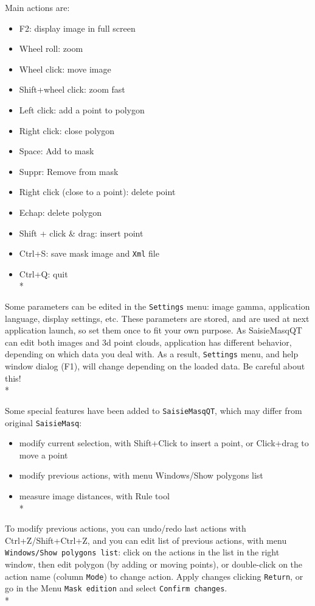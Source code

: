 Main actions are:
\begin{itemize}
\item F2: display image in full screen
\item Wheel roll: zoom
\item Wheel click: move image
\item Shift+wheel click: zoom fast
\item Left click: add a point to polygon
\item Right click: close polygon
\item Space: Add to mask
\item Suppr: Remove from mask
\item Right click (close to a point): delete point
\item Echap: delete polygon
\item Shift + click \& drag: insert point
\item Ctrl+S: save mask image and {\tt Xml} file
\item Ctrl+Q: quit\\*
\end{itemize}

Some parameters can be edited in the {\tt Settings} menu: image gamma, application language, display settings, etc. These parameters are stored, and are used at next application launch, so set them once to fit your own purpose. As SaisieMasqQT can edit both images and 3d point clouds, application has different behavior, depending on which data you deal with. As a result, {\tt Settings} menu, and help window dialog (F1), will change depending on the loaded data. Be careful about this!\\*

Some special features have been added to {\tt SaisieMasqQT}, which may differ from original {\tt SaisieMasq}: 
\begin{itemize}
\item modify current selection, with Shift+Click to insert a point, or Click+drag to move a point
\item modify previous actions, with menu Windows/Show polygons list 
\item measure image distances, with Rule tool\\*
\end{itemize}

To modify previous actions, you can undo/redo last actions with Ctrl+Z/Shift+Ctrl+Z, and you can edit list of previous actions, with menu {\tt Windows/Show polygons list}: click on the actions in the list in the right window, then edit polygon (by adding or moving points), or double-click on the action name (column {\tt Mode}) to change action. Apply changes clicking {\tt Return}, or go in the Menu {\tt Mask edition} and select {\tt Confirm changes}.\\*

